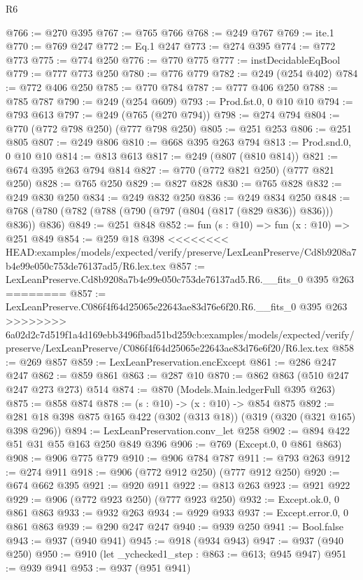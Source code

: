 \begin{lexlean}{R6}
\begin{coremodule}
{{{{{{{{{{{{{{{@766 := @270 @395
@767 := @765 @766
@768 := @249 @767
@769 := ite.{1}
@770 := @769 @247
@772 := Eq.{1} @247
@773 := @274 @395
@774 := @772 @773
@775 := @774 @250
@776 := @770 @775
@777 := instDecidableEqBool
@779 := @777 @773 @250
@780 := @776 @779
@782 := @249 (@254 @402)
@784 := @772 @406 @250
@785 := @770 @784
@787 := @777 @406 @250
@788 := @785 @787
@790 := @249 (@254 @609)
@793 := Prod.fst.{0, 0} @10 @10
@794 := @793 @613
@797 := @249 (@765 (@270 @794))
@798 := @274 @794
@804 := @770 (@772 @798 @250) (@777 @798 @250)
@805 := @251 @253
@806 := @251 @805
@807 := @249 @806
@810 := @668 @395 @263 @794
@813 := Prod.snd.{0, 0} @10 @10
@814 := @813 @613
@817 := @249 (@807 (@810 @814))
@821 := @674 @395 @263 @794 @814
@827 := @770 (@772 @821 @250) (@777 @821 @250)
@828 := @765 @250
@829 := @827 @828
@830 := @765 @828
@832 := @249 @830 @250
@834 := @249 @832 @250
@836 := @249 @834 @250
@848 := @768 (@780 (@782 (@788 (@790 (@797 (@804 (@817 (@829 @836)) @836))) @836)) @836)
@849 := @251 @848
@852 := fun (s : @10) => fun (x : @10) => @251 @849
@854 := @259 @18 @398
<<<<<<<< HEAD:examples/models/expected/verify/preserve/LexLeanPreserve/Cd8b9208a7b4e99e050c753de76137ad5/R6.lex.tex
@857 := LexLeanPreserve.Cd8b9208a7b4e99e050c753de76137ad5.R6.__fits_0 @395 @263
========
@857 := LexLeanPreserve.C086f4f64d25065e22643ae83d76e6f20.R6.__fits_0 @395 @263
>>>>>>>> 6a02d2c7d519f1a4d169ebb3496fbad51bd259cb:examples/models/expected/verify/preserve/LexLeanPreserve/C086f4f64d25065e22643ae83d76e6f20/R6.lex.tex
@858 := @269 @857
@859 := LexLeanPreservation.encExcept
@861 := @286 @247 @247
@862 := @859 @861
@863 := @287 @10
@870 := @862 @863 (@510 @247 @247 @273 @273) @514
@874 := @870 (Models.Main.ledgerFull @395 @263)
@875 := @858 @874
@878 := (s : @10) -> (x : @10) -> @854 @875
@892 := @281 @18 @398 @875 @165 @422 (@302 (@313 @18)) (@319 (@320 (@321 @165) @398 @296))
@894 := LexLeanPreservation.conv_let @258
@902 := @894 @422 @51 @31 @55 @163 @250 @849 @396
@906 := @769 (Except.{0, 0} @861 @863)
@908 := @906 @775 @779
@910 := @906 @784 @787
@911 := @793 @263
@912 := @274 @911
@918 := @906 (@772 @912 @250) (@777 @912 @250)
@920 := @674 @662 @395
@921 := @920 @911
@922 := @813 @263
@923 := @921 @922
@929 := @906 (@772 @923 @250) (@777 @923 @250)
@932 := Except.ok.{0, 0} @861 @863
@933 := @932 @263
@934 := @929 @933
@937 := Except.error.{0, 0} @861 @863
@939 := @290 @247 @247
@940 := @939 @250
@941 := Bool.false
@943 := @937 (@940 @941)
@945 := @918 (@934 @943)
@947 := @937 (@940 @250)
@950 := @910 (let _ychecked1_step : @863 := @613; @945 @947)
@951 := @939 @941
@953 := @937 (@951 @941)
}}}}}}}}}}}}}}}
\end{coremodule}
\end{lexlean}
